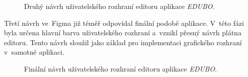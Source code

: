 \documentclass[male,czech,api_bc]{kitheses}
\begin{document}
\begin{figure}[H]
	\centering
	\caption{Druhý návrh uživatelského rozhraní editoru aplikace \textit{EDUBO}.}
	\label{fig:edubo-navrh-2}
\end{figure}

Třetí návrh ve~Figma již téměř odpovídal finální podobě aplikace. V~této fázi byla určena hlavní barva uživatelského rozhraní a~vznikl přesný návrh plátna editoru. Tento návrh sloužil jako základ pro implementaci grafického rozhraní v~samotné aplikaci.

\begin{figure}[H]
	\centering
	\caption{Finální návrh uživatelského rozhraní editoru aplikace \textit{EDUBO}.}
	\label{fig:edubo-navrh-3}
\end{figure}
\end{document}
